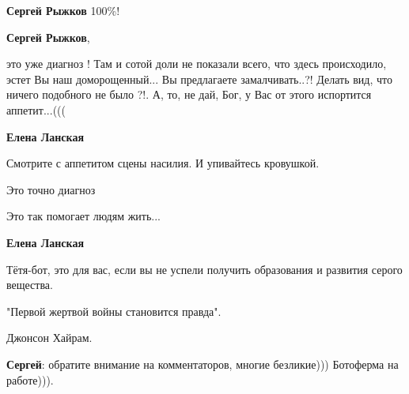 \begin{itemize}
\begin{itemize}
\textbf{Сергей Рыжков}
100\%!

 
\textbf{Сергей Рыжков}, 

это уже диагноз ! Там и сотой доли не показали всего, что здесь происходило,
эстет Вы наш доморощенный... Вы предлагаете замалчивать..?! Делать вид, что
ничего подобного не было ?!. А, то, не дай, Бог, у Вас от этого испортится
аппетит...(((


 
\textbf{Елена Ланская} 

Смотрите с аппетитом сцены насилия. И упивайтесь кровушкой.

Это точно диагноз

Это так помогает людям жить...

 
\textbf{Елена Ланская}

Тётя-бот, это для вас, если вы не успели получить образования и развития серого вещества.

"Первой жертвой войны становится правда".

Джонсон Хайрам.


 
\textbf{Сергей}: обратите внимание на комментаторов, многие безликие))) Ботоферма на работе))).

 

\end{itemize}
\end{itemize}
